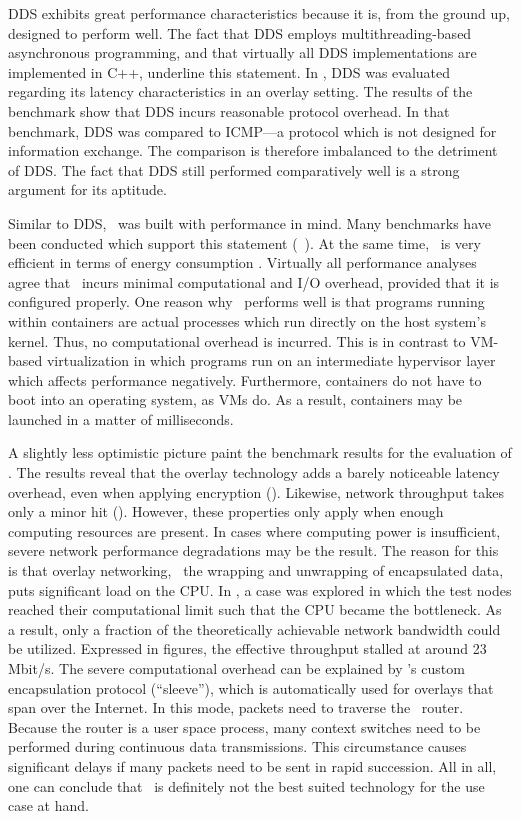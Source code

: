 DDS exhibits great performance characteristics because it is, from the ground up, designed to perform well. The fact that DDS employs multithreading-based asynchronous programming, and that virtually all DDS implementations are implemented in C++, underline this statement. In , DDS was evaluated regarding its latency characteristics in an overlay setting. The results of the benchmark show that DDS incurs reasonable protocol overhead. In that benchmark, DDS was compared to ICMP---a protocol which is not designed for information exchange. The comparison is therefore imbalanced to the detriment of DDS. The fact that DDS still performed comparatively well is a strong argument for its aptitude.

Similar to DDS, \docker\ was built with performance in mind. Many benchmarks have been conducted which support this statement (\eg\ \cite{adufu2015container, felter2015updated, morabito2015hypervisors, xavier2013performance}). At the same time, \docker\ is very efficient in terms of energy consumption \cite{morabito2015power}. Virtually all performance analyses agree that \docker\ incurs minimal computational and I/O overhead, provided that it is configured properly. One reason why \docker\ performs well is that programs running within containers are actual processes which run directly on the host system's kernel. Thus, no computational overhead is incurred. This is in contrast to VM-based virtualization in which programs run on an intermediate hypervisor layer which affects performance negatively. Furthermore, containers do not have to boot into an operating system, as VMs do. As a result, containers may be launched in a matter of milliseconds.

A slightly less optimistic picture paint the benchmark results for the evaluation of \wnet . The results reveal that the overlay technology adds a barely noticeable latency overhead, even when applying encryption (\cf {}). Likewise, network throughput takes only a minor hit (\cf {}). However, these properties only apply when enough computing resources are present. In cases where computing power is insufficient, severe network performance degradations may be the result. The reason for this is that overlay networking, \ie\ the wrapping and unwrapping of encapsulated data, puts significant load on the CPU. In , a case was explored in which the test nodes reached their computational limit such that the CPU became the bottleneck. As a result, only a fraction of the theoretically achievable network bandwidth could be utilized. Expressed in figures, the effective throughput stalled at around 23 Mbit/s. The severe computational overhead can be explained by \weave 's custom encapsulation protocol (``sleeve''), which is automatically used for overlays that span over the Internet. In this mode, packets need to traverse the \weave\ router. Because the router is a user space process, many context switches need to be performed during continuous data transmissions. This circumstance causes significant delays if many packets need to be sent in rapid succession. All in all, one can conclude that \wnet\ is definitely not the best suited technology for the use case at hand.


